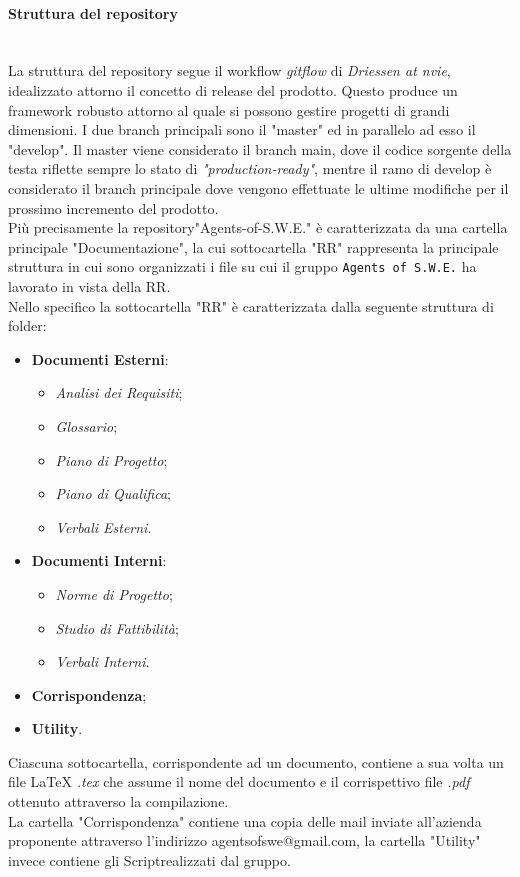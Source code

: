 \paragraph{Struttura del repository} \-\\ 
La struttura del repository segue il workflow \textit{gitflow} di \textit{Driessen at nvie}, idealizzato attorno il concetto di release del prodotto. Questo produce un framework robusto attorno al quale si possono gestire progetti di grandi dimensioni. I due branch principali sono il "master" ed in parallelo ad esso il "develop". 
Il master viene considerato il branch main, dove il codice sorgente della testa riflette sempre lo stato di \textit{"production-ready"},
mentre il ramo di develop è considerato il branch principale dove vengono effettuate le ultime modifiche per il prossimo incremento del prodotto.\\
Più precisamente la repository\glossario "Agents-of-S.W.E." è caratterizzata da una cartella principale "Documentazione", la cui sottocartella "RR" rappresenta la principale struttura in cui sono organizzati i file su cui il gruppo \texttt{Agents of S.W.E.} ha lavorato in vista della RR.\\
	Nello specifico la sottocartella "RR" è caratterizzata dalla seguente struttura di folder:
	\begin{itemize}
	\item \textbf{Documenti Esterni}:
		\begin{itemize}
		\item \textit{Analisi dei Requisiti};
		\item \textit{Glossario};
		\item \textit{Piano di Progetto};
		\item \textit{Piano di Qualifica};
		\item \textit{Verbali Esterni}.
		\end{itemize}
	\item \textbf{Documenti Interni}:
		\begin{itemize}
		\item \textit{Norme di Progetto};
		\item \textit{Studio di Fattibilità};
		\item \textit{Verbali Interni}.
		\end{itemize}
	\item \textbf{Corrispondenza};
	\item \textbf{Utility}.
	\end{itemize}
	Ciascuna sottocartella, corrispondente ad un documento, contiene a sua volta un file LaTeX \textit{.tex} che assume il nome del documento e il corrispettivo file \textit{.pdf} ottenuto attraverso la compilazione.\\
	La cartella "Corrispondenza" contiene una copia delle mail inviate all'azienda proponente attraverso l'indirizzo agentsofswe@gmail.com, la cartella "Utility" invece contiene gli Script\glossario realizzati dal gruppo.


